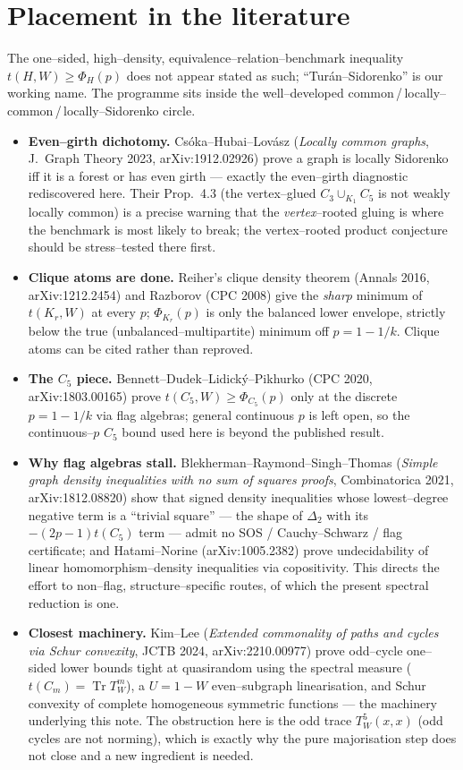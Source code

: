 \documentclass[11pt]{article}
\theoremstyle{definition}
\newcommand{\Tr}{\operatorname{Tr}}
\newcommand{\tw}{T_W}
\begin{document}
\section{Placement in the literature}\label{app:lit}

The one--sided, high--density, equivalence--relation--benchmark inequality
$t(H,W)\ge\Phi_H(p)$ does not appear stated as such; ``Turán--Sidorenko'' is our
working name.  The programme sits inside the well--developed
common\,/\,locally--common\,/\,locally--Sidorenko circle.

\begin{itemize}[leftmargin=1.4em]
\item \textbf{Even--girth dichotomy.}  Cs\'oka--Hubai--Lov\'asz (\emph{Locally
common graphs}, J.\ Graph Theory 2023, arXiv:1912.02926) prove a graph is locally
Sidorenko iff it is a forest or has even girth --- exactly the even--girth
diagnostic rediscovered here.  Their Prop.\ 4.3 (the vertex--glued
$C_3\cup_{K_1}C_5$ is not weakly locally common) is a precise warning that the
\emph{vertex}--rooted gluing is where the benchmark is most likely to break; the
vertex--rooted product conjecture should be stress--tested there first.
\item \textbf{Clique atoms are done.}  Reiher's clique density theorem (Annals
2016, arXiv:1212.2454) and Razborov (CPC 2008) give the \emph{sharp} minimum of
$t(K_r,W)$ at every $p$; $\Phi_{K_r}(p)$ is only the balanced lower envelope,
strictly below the true (unbalanced--multipartite) minimum off $p=1-1/k$.  Clique
atoms can be cited rather than reproved.
\item \textbf{The $C_5$ piece.}  Bennett--Dudek--Lidick\'y--Pikhurko (CPC 2020,
arXiv:1803.00165) prove $t(C_5,W)\ge\Phi_{C_5}(p)$ only at the discrete
$p=1-1/k$ via flag algebras; general continuous $p$ is left open, so the
continuous--$p$ $C_5$ bound used here is beyond the published result.
\item \textbf{Why flag algebras stall.}  Blekherman--Raymond--Singh--Thomas
(\emph{Simple graph density inequalities with no sum of squares proofs},
Combinatorica 2021, arXiv:1812.08820) show that signed density inequalities whose
lowest--degree negative term is a ``trivial square'' --- the shape of $\Delta_2$
with its $-(2p-1)t(C_5)$ term --- admit no SOS / Cauchy--Schwarz / flag
certificate; and Hatami--Norine (arXiv:1005.2382) prove undecidability of linear
homomorphism--density inequalities via copositivity.  This directs the effort to
non--flag, structure--specific routes, of which the present spectral reduction is
one.
\item \textbf{Closest machinery.}  Kim--Lee (\emph{Extended commonality of paths
and cycles via Schur convexity}, JCTB 2024, arXiv:2210.00977) prove odd--cycle
one--sided lower bounds tight at quasirandom using the spectral measure
($t(C_m)=\Tr\tw^m$), a $U=1-W$ even--subgraph linearisation, and Schur convexity
of complete homogeneous symmetric functions --- the machinery underlying this
note.  The obstruction here is the odd trace $\tw^5(x,x)$ (odd cycles are not
norming), which is exactly why the pure majorisation step does not close and a new
ingredient is needed.
\end{itemize}
\end{document}
